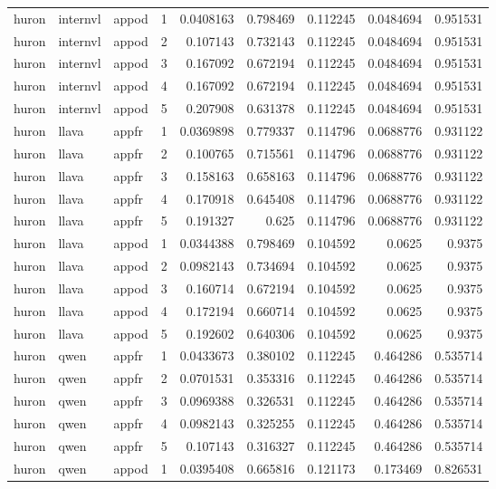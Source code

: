 \begin{longtable}{lllrrrrrr}
huron & internvl & appod & 1 & 0.0408163 & 0.798469 & 0.112245 & 0.0484694 & 0.951531 \\
huron & internvl & appod & 2 & 0.107143 & 0.732143 & 0.112245 & 0.0484694 & 0.951531 \\
huron & internvl & appod & 3 & 0.167092 & 0.672194 & 0.112245 & 0.0484694 & 0.951531 \\
huron & internvl & appod & 4 & 0.167092 & 0.672194 & 0.112245 & 0.0484694 & 0.951531 \\
huron & internvl & appod & 5 & 0.207908 & 0.631378 & 0.112245 & 0.0484694 & 0.951531 \\
huron & llava & appfr & 1 & 0.0369898 & 0.779337 & 0.114796 & 0.0688776 & 0.931122 \\
huron & llava & appfr & 2 & 0.100765 & 0.715561 & 0.114796 & 0.0688776 & 0.931122 \\
huron & llava & appfr & 3 & 0.158163 & 0.658163 & 0.114796 & 0.0688776 & 0.931122 \\
huron & llava & appfr & 4 & 0.170918 & 0.645408 & 0.114796 & 0.0688776 & 0.931122 \\
huron & llava & appfr & 5 & 0.191327 & 0.625 & 0.114796 & 0.0688776 & 0.931122 \\
huron & llava & appod & 1 & 0.0344388 & 0.798469 & 0.104592 & 0.0625 & 0.9375 \\
huron & llava & appod & 2 & 0.0982143 & 0.734694 & 0.104592 & 0.0625 & 0.9375 \\
huron & llava & appod & 3 & 0.160714 & 0.672194 & 0.104592 & 0.0625 & 0.9375 \\
huron & llava & appod & 4 & 0.172194 & 0.660714 & 0.104592 & 0.0625 & 0.9375 \\
huron & llava & appod & 5 & 0.192602 & 0.640306 & 0.104592 & 0.0625 & 0.9375 \\
huron & qwen & appfr & 1 & 0.0433673 & 0.380102 & 0.112245 & 0.464286 & 0.535714 \\
huron & qwen & appfr & 2 & 0.0701531 & 0.353316 & 0.112245 & 0.464286 & 0.535714 \\
huron & qwen & appfr & 3 & 0.0969388 & 0.326531 & 0.112245 & 0.464286 & 0.535714 \\
huron & qwen & appfr & 4 & 0.0982143 & 0.325255 & 0.112245 & 0.464286 & 0.535714 \\
huron & qwen & appfr & 5 & 0.107143 & 0.316327 & 0.112245 & 0.464286 & 0.535714 \\
huron & qwen & appod & 1 & 0.0395408 & 0.665816 & 0.121173 & 0.173469 & 0.826531 \\

\end{longtable}
